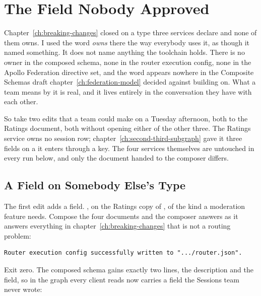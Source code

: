 \section{The Field Nobody Approved}
\label{sec:ch17-the-field-nobody-approved}

%
Chapter~\ref{ch:breaking-changes} closed on a type three services declare and
none of them owns. I used the word \emph{owns} there the way everybody uses
it, as though it named something. It does not name anything the toolchain
holds. There is no owner in the composed schema, none in the router execution
config, none in the Apollo Federation directive set, and the word appears
nowhere in the Composite Schemas draft
chapter~\ref{ch:federation-model} decided against building on. What a team
means by it is real, and it lives entirely in the conversation they have with
each other.

%
So take two edits that a team could make on a Tuesday afternoon, both to the
Ratings document, both without opening either of the other three. The Ratings
service owns no session row; chapter~\ref{ch:second-third-subgraph} gave it
three fields on a  it enters through a key. The four services
themselves are untouched in every run below, and only the document handed to
the composer differs.

\subsection{A Field on Somebody Else's Type}

%
The first edit adds a field. , on the Ratings copy of
, of the kind a moderation feature needs. Compose the four
documents and the composer answers as it answers everything in
chapter~\ref{ch:breaking-changes} that is not a routing problem:

\begin{verbatim}
Router execution config successfully written to ".../router.json".
\end{verbatim}

%
Exit zero. The composed schema gains exactly two lines, the description and
the field, so  in the graph every client reads now carries a
field the Sessions team never wrote:

